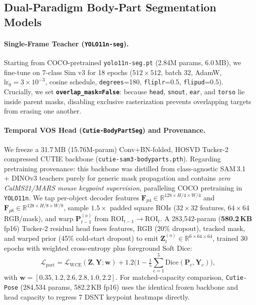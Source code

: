 \documentclass[10pt,twocolumn,letterpaper]{article}
\begin{document}
\subsection{Dual-Paradigm Body-Part Segmentation Models}
\label{sec:models}

\paragraph{Single-Frame Teacher (\texttt{YOLO11n-seg}).} Starting from COCO-pretrained \texttt{yolo11n-seg.pt} (2.84M params, 6.0\,MB), we fine-tune on 7-class Sim v3 for 18 epochs ($512\times 512$, batch 32, AdamW, $\mathrm{lr}_0=3\times 10^{-3}$, cosine schedule, \texttt{degrees}=180, \texttt{fliplr}=0.5, \texttt{flipud}=0.5). Crucially, we set \textbf{\texttt{overlap\_mask=False}}: because \texttt{head}, \texttt{snout}, \texttt{ear}, and \texttt{torso} lie inside parent masks, disabling exclusive rasterization prevents overlapping targets from erasing one another.

\paragraph{Temporal VOS Head (\texttt{Cutie-BodyPartSeg}) and Provenance.} We freeze a 31.7\,MB (15.76M-param) Conv+BN-folded, HOSVD Tucker-2 compressed CUTIE backbone (\texttt{cutie-sam3-bodyparts.pth}). Regarding pretraining provenance: this backbone was distilled from class-agnostic SAM\,3.1 + DINOv3 teachers purely for generic mask propagation and contains \emph{zero CalMS21/MARS mouse keypoint supervision}, paralleling COCO pretraining in \texttt{YOLO11n}. We tap per-object decoder features $\mathbf{F}_{p4}\in\mathbb{R}^{128\times H/4\times W/4}$ and $\mathbf{F}_{p8}\in\mathbb{R}^{128\times H/8\times W/8}$, sample $1.5\times$ padded square ROIs ($32\times 32$ features, $64\times 64$ RGB/mask), and warp $\mathbf{P}_{t-1}^{(o)}$ from $\mathrm{ROI}_{t-1}\to\mathrm{ROI}_t$. A 283,542-param (\textbf{580.2\,KB} fp16) Tucker-2 residual head fuses features, RGB (20\% dropout), tracked mask, and warped prior (45\% cold-start dropout) to emit $\mathbf{Z}_t^{(o)}\in\mathbb{R}^{6\times 64\times 64}$, trained 30 epochs with weighted cross-entropy plus foreground Soft Dice:
{\small
\begin{equation}
  \mathcal{L}_{\text{part}} = \mathcal{L}_{\text{WCE}}(\mathbf{Z}, \mathbf{Y}; \mathbf{w}) + 1.2\Big(1 - \tfrac{1}{5}\textstyle\sum_{c=1}^{5}\mathrm{Dice}(\mathbf{P}_c, \mathbf{Y}_c)\Big),
\end{equation}}
with $\mathbf{w}=[0.35, 1.2, 2.6, 2.8, 1.0, 2.2]$. For matched-capacity comparison, \texttt{Cutie-Pose} (284,534 params, 582.2\,KB fp16) uses the identical frozen backbone and head capacity to regress 7 DSNT keypoint heatmaps directly.
\end{document}
